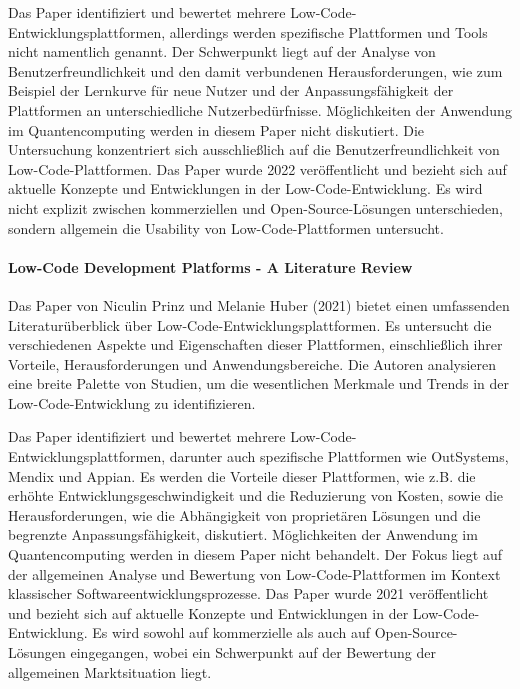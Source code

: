 Das Paper identifiziert und bewertet mehrere Low-Code-Entwicklungsplattformen, allerdings werden spezifische Plattformen 
und Tools nicht namentlich genannt. Der Schwerpunkt liegt auf der Analyse von Benutzerfreundlichkeit und den damit 
verbundenen Herausforderungen, wie zum Beispiel der Lernkurve für neue Nutzer und der Anpassungsfähigkeit der 
Plattformen an unterschiedliche Nutzerbedürfnisse. 
Möglichkeiten der Anwendung im Quantencomputing werden in diesem Paper nicht diskutiert. 
Die Untersuchung konzentriert sich ausschließlich auf die Benutzerfreundlichkeit von Low-Code-Plattformen. 
Das Paper wurde 2022 veröffentlicht und bezieht sich auf aktuelle Konzepte und Entwicklungen in der Low-Code-Entwicklung. 
Es wird nicht explizit zwischen kommerziellen und Open-Source-Lösungen unterschieden, 
sondern allgemein die Usability von Low-Code-Plattformen untersucht.

\paragraph{Low-Code Development Platforms - A Literature Review}

Das Paper von Niculin Prinz und Melanie Huber (2021) \cite{Prinz_2021} bietet einen umfassenden Literaturüberblick über Low-Code-Entwicklungsplattformen. 
Es untersucht die verschiedenen Aspekte und Eigenschaften dieser Plattformen, einschließlich ihrer Vorteile, Herausforderungen 
und Anwendungsbereiche. Die Autoren analysieren eine breite Palette von Studien, um die wesentlichen Merkmale und Trends 
in der Low-Code-Entwicklung zu identifizieren.

Das Paper identifiziert und bewertet mehrere Low-Code-Entwicklungsplattformen, darunter auch spezifische Plattformen wie 
OutSystems, Mendix und Appian. Es werden die Vorteile dieser Plattformen, wie z.B. die erhöhte Entwicklungsgeschwindigkeit und 
die Reduzierung von Kosten, sowie die Herausforderungen, wie die Abhängigkeit von proprietären Lösungen und die begrenzte 
Anpassungsfähigkeit, diskutiert. Möglichkeiten der Anwendung im Quantencomputing werden in diesem Paper nicht behandelt. 
Der Fokus liegt auf der allgemeinen Analyse und Bewertung von Low-Code-Plattformen im Kontext 
klassischer Softwareentwicklungsprozesse. Das Paper wurde 2021 veröffentlicht und 
bezieht sich auf aktuelle Konzepte und Entwicklungen in der Low-Code-Entwicklung. Es wird sowohl auf kommerzielle als 
auch auf Open-Source-Lösungen eingegangen, wobei ein Schwerpunkt auf der Bewertung der allgemeinen Marktsituation liegt.

